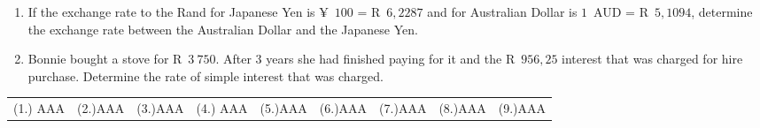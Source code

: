 \begin{eocexercises}{}
\begin{enumerate}[label=\textbf{\arabic*}.]
	\item If the exchange rate to the Rand for Japanese Yen is
          ¥~$100$ = R~$6,2287$ and for Australian Dollar is $1$~AUD =
          R~$5,1094$, determine the exchange rate between the
          Australian Dollar and the Japanese Yen.

	\item Bonnie bought a stove for R~$3~750$. After $3$ years she had finished paying for it and the R~$956,25$ interest that was charged for hire purchase. Determine the rate of simple interest that was charged.
    \end{enumerate}
\practiceinfo

    \begin{tabularx}{\textwidth}{ XXXXXXXXX }
	(1.) AAA& (2.)AAA & (3.)AAA & (4.) AAA& (5.)AAA & (6.)AAA & (7.)AAA & (8.)AAA & (9.)AAA\\
    \end{tabularx}
\end{eocexercises}
